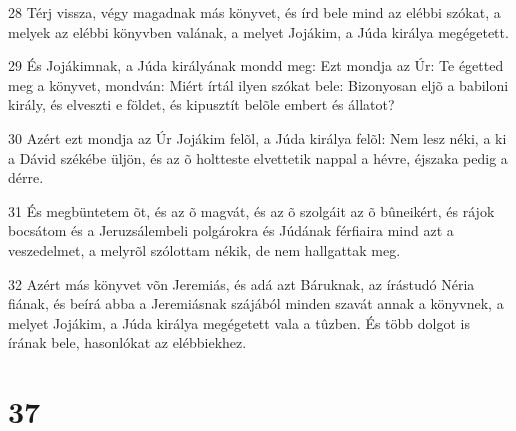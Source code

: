 \par 28 Térj vissza, végy magadnak más könyvet, és írd bele mind az elébbi szókat, a melyek az elébbi könyvben valának, a melyet Jojákim, a Júda királya megégetett.
\par 29 És Jojákimnak, a Júda királyának mondd meg: Ezt mondja az Úr: Te égetted meg a könyvet, mondván: Miért írtál ilyen szókat bele: Bizonyosan eljõ a babiloni király, és elveszti e földet, és kipusztít belõle embert és állatot?
\par 30 Azért ezt mondja az Úr Jojákim felõl, a Júda királya felõl: Nem lesz néki, a ki a Dávid székébe üljön, és az õ holtteste elvettetik nappal a hévre, éjszaka pedig a dérre.
\par 31 És megbüntetem õt, és az õ magvát, és az õ szolgáit az õ bûneikért, és rájok bocsátom és a Jeruzsálembeli polgárokra és Júdának férfiaira mind azt a veszedelmet, a melyrõl szólottam nékik, de nem hallgattak meg.
\par 32 Azért más könyvet võn Jeremiás, és adá azt Báruknak, az írástudó Néria fiának, és beírá abba a Jeremiásnak szájából minden szavát annak a könyvnek, a melyet Jojákim, a Júda királya megégetett vala a tûzben. És több dolgot is írának bele, hasonlókat az elébbiekhez.

\chapter{37}

